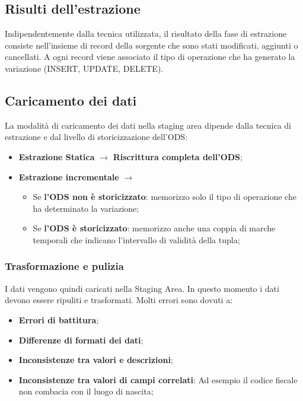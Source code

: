 \subsection{Risulti dell'estrazione}
Indipendentemente dalla tecnica utilizzata, il risultato della fase di estrazione consiste nell'insieme di record della sorgente che sono stati modificati, aggiunti o cancellati. A ogni record viene associato il tipo di operazione che ha generato la variazione (INSERT, UPDATE, DELETE).

\subsection{Caricamento dei dati}
La modalità di caricamento dei dati nella staging area dipende dalla tecnica di estrazione e dal livello di storicizzazione dell'ODS:
\begin{itemize}
	\item \textbf{Estrazione Statica} $\xrightarrow{}$ \textbf{Riscrittura completa dell'ODS};
	\item \textbf{Estrazione incrementale} $\xrightarrow{}$
	\begin{itemize}
		\item Se \textbf{l'ODS non è storicizzato}: memorizzo solo il tipo di operazione che ha determinato la variazione;
		\item Se \textbf{l'ODS è storicizzato}: memorizzo anche una coppia di marche temporali che indicano l'intervallo di validità della tupla;
	\end{itemize}
\end{itemize}

\subsubsection{Trasformazione e pulizia}
I dati vengono quindi caricati nella Staging Area. In questo momento i dati devono essere ripuliti e trasformati. Molti errori sono dovuti a:
\begin{itemize}
	\item \textbf{Errori di battitura};
	\item \textbf{Differenze di formati dei dati};
	\item \textbf{Inconsistenze tra valori e descrizioni};
	\item \textbf{Inconsistenze tra valori di campi correlati}: Ad esempio il codice fiscale non combacia con il luogo di nascita;
\end{itemize}

